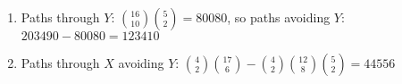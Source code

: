\documentclass[12pt, a4paper]{article}
\begin{document}
\begin{enumerate}[Q\arabic*.]
\begin{enumerate}[(\roman*)]
      \item Paths through $Y$: $\displaystyle\binom {16}{10}\binom{5}{2} = 80080$, so paths avoiding $Y$: $203490 - 80080 = 123410$

      \item Paths through $X$ avoiding $Y$: $\displaystyle\binom 42 \binom {17}{6} - \binom 42\binom{12}{8}\binom{5}{2} = 44556$
    \end{enumerate}
\end{enumerate}
\end{document}
